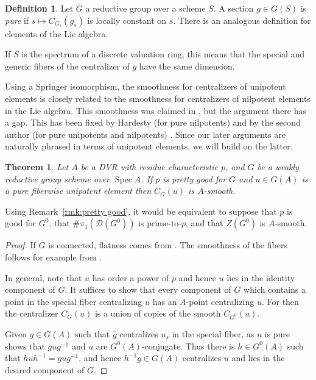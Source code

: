 \documentclass[11pt, letterpaper,english]{amsart}
\theoremstyle{plain}
\newtheorem{theorem}[lem]{Theorem}
\theoremstyle{definition}
\newtheorem{defn}[lem]{Definition}
\numberwithin{equation}{section}
\numberwithin{lem}{section}
\newcommand{\sD}{{\mathscr D}}
\DeclareMathOperator{\Spec}{Spec}
\begin{document}
\begin{defn} \label{defn:pure}
Let $G$ a reductive group over a scheme $S$.  
A section $g \in G(S)$ is \emph{pure} if $s \mapsto C_{G_s}(g_s)$ is locally constant on $s$.  There is an analogous definition for elements of the Lie algebra.  
\end{defn}

If $S$ is the spectrum of a discrete valuation ring, this means that the special and generic fibers of the centralizer of $g$ have the same dimension.

Using a Springer isomorphism, the smoothness for centralizers of unipotent elements is closely related to the smoothness for centralizers of nilpotent elements in the Lie algebra.  This smoothness was claimed in \cite{mcninch08}, but the argument there has a gap.  This has been fixed by Hardesty (for pure nilpotents) and by the second author (for pure unipotents and nilpotents) \cite{Hardesty,cotner}.  Since our later arguments are naturally phrased in terms of unipotent elements, we will build on the latter.  


\begin{theorem} \label{theorem:unipotentcentralizer}
Let $A$ be a DVR with residue characteristic $p$, and $G$ be a weakly reductive group scheme over $\Spec A$.
 If $p$ is pretty good for $G$ and $u \in G(A)$ is a pure fiberwise unipotent element then $C_G(u)$ is $A$-smooth. 
\end{theorem}

Using Remark~\ref{rmk:pretty good}, it would be equivalent to suppose that $p$ is good for $G^0$, that $\# \pi_1 (\sD(G^{0}))$ is prime-to-$p$, and that $Z(G^0)$ is $A$-smooth. 

\begin{proof}
If $G$ is connected, flatness comes from {\cite[Theorem 1.1]{cotner}}.  The smoothness of the fibers follows for example from  \cite[Theorem 1.1]{herpel}.

In general, note that $\overline{u}$ has order a power of $p$ and hence $u$ lies in the identity component of $G$.
It suffices to show that every component of $G$ which contains a point in the special fiber centralizing $u$ has an $A$-point centralizing $u$.  For then the centralizer $C_G(u)$ is a union of copies of the smooth $C_{G^0}(u)$.

Given $g \in G(A)$ such that $\overline{g}$ centralizes $u_s$ in the special fiber,
as $u$ is pure \cite[Theorem 5.11]{cotner} shows that $gu g^{-1}$ and $u$ are $G^0(A)$-conjugate.  Thus there is $h \in G^0(A)$ such that $h u h^{-1} = g u g^{-1}$, and hence $h^{-1} g \in G(A)$ centralizes $u$ and lies in the desired component of $G$. 
\end{proof}
\end{document}
